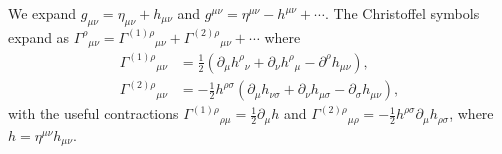 \begin{solution}

We expand $g_{\mu\nu}=\eta_{\mu\nu}+h_{\mu\nu}$ and $g^{\mu\nu}=\eta^{\mu\nu}-h^{\mu\nu}+\cdots$. The Christoffel symbols expand as $\Gamma^\rho{}_{\mu\nu}=\Gamma^{(1)\rho}{}_{\mu\nu}+\Gamma^{(2)\rho}{}_{\mu\nu}+\cdots$ where
\begin{align}
    \Gamma^{(1)\rho}{}_{\mu\nu} &= \frac{1}{2}\left(\partial_\mu h^\rho{}_\nu+\partial_\nu h^\rho{}_\mu-\partial^\rho h_{\mu\nu}\right),\\
    \Gamma^{(2)\rho}{}_{\mu\nu} &= -\frac{1}{2}h^{\rho\sigma}\left(\partial_\mu h_{\nu\sigma}+\partial_\nu h_{\mu\sigma}-\partial_\sigma h_{\mu\nu}\right),
\end{align}
with the useful contractions $\Gamma^{(1)\rho}{}_{\rho\mu}=\frac{1}{2}\partial_\mu h$ and $\Gamma^{(2)\rho}{}_{\mu\rho}=-\frac{1}{2}h^{\rho\sigma}\partial_\mu h_{\rho\sigma}$, where $h=\eta^{\mu\nu}h_{\mu\nu}$.


\end{solution}
